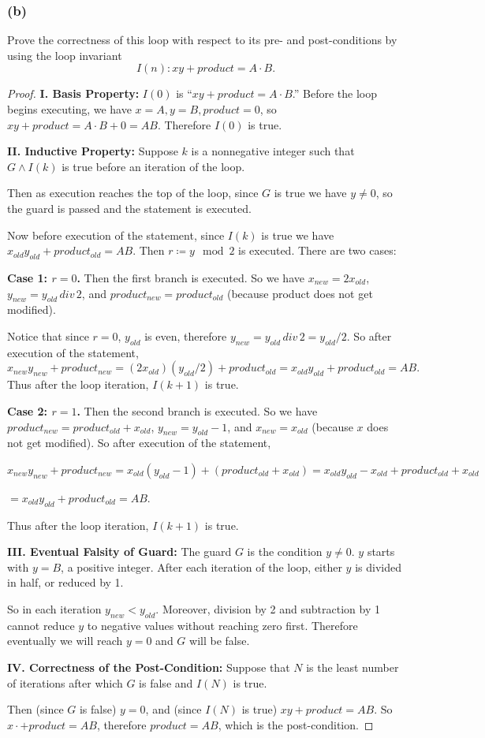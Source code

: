 \documentclass[14pt]{extarticle}
\begin{document}
\subsubsection{(b)}
Prove the correctness of this loop with respect to its pre- and post-conditions by using the loop invariant
\[
I(n): xy + product = A \cdot B.
\]
\begin{proof}
{\bf I. Basis Property:} $I(0)$ is ``$xy + product = A \cdot B$.'' Before the loop begins executing, we have 
$x = A, y = B, product = 0$, so $xy + product = A \cdot B + 0 = AB$. Therefore $I(0)$ is true. 

{\bf II. Inductive Property:} Suppose $k$ is a nonnegative integer such that $G \wedge I(k)$ is true before an 
iteration of the loop. 

Then as execution reaches the top of the loop, since $G$ is true we have $y \neq 0$, 
so the guard is passed and the statement is executed. 

Now before execution of the statement, since $I(k)$ is true we have $x_{old}y_{old} + product_{old} = AB$. 
Then $r \coloneqq y \mod 2$ is executed. There are two cases:

{\bf Case 1: $r = 0$.} Then the first branch is executed. So we have $x_{new} = 2x_{old}$, 
$y_{new} = y_{old} \, div \, 2$, and $product_{new} = product_{old}$ (because product does not get modified).

Notice that since $r = 0$, $y_{old}$ is even, therefore $y_{new} = y_{old} \, div \, 2 = y_{old} / 2$. 
So after execution of the statement, 
\[
x_{new}y_{new} + product_{new} = (2x_{old})(y_{old} / 2) + product_{old} = x_{old}y_{old} + product_{old} = AB.
\]
Thus after the loop iteration, $I(k + 1)$ is true. 

{\bf Case 2: $r = 1$.} Then the second branch is executed. So we have $product_{new} = product_{old} + x_{old}$, 
$y_{new} = y_{old} - 1$, and $x_{new} = x_{old}$ (because $x$ does not get modified). So after execution of the statement, 

$x_{new}y_{new} + product_{new} = x_{old}(y_{old} - 1) + (product_{old} + x_{old}) = x_{old}y_{old} - x_{old} + product_{old} + x_{old}$ 

$= x_{old}y_{old} + product_{old} = AB.$

Thus after the loop iteration, $I(k + 1)$ is true. 

{\bf III. Eventual Falsity of Guard:} The guard $G$ is the condition $y \neq 0$. $y$ starts with $y = B$, a positive integer.
After each iteration of the loop, either $y$ is divided in half, or reduced by 1.

So in each iteration $y_{new} < y_{old}$. Moreover, division by 2 and subtraction by 1 cannot reduce $y$ to 
negative values without reaching zero first. Therefore eventually we will reach $y = 0$ and $G$ will be false. 

{\bf IV. Correctness of the Post-Condition:} Suppose that $N$ is the least number of iterations after which $G$ is false and $I(N)$ is true. 

Then (since $G$ is false) $y = 0$, and (since $I(N)$ is true) $xy + product = AB$. So $x \cdot + product = AB$,
therefore $product = AB$, which is the post-condition.
\end{proof}
\end{document}
